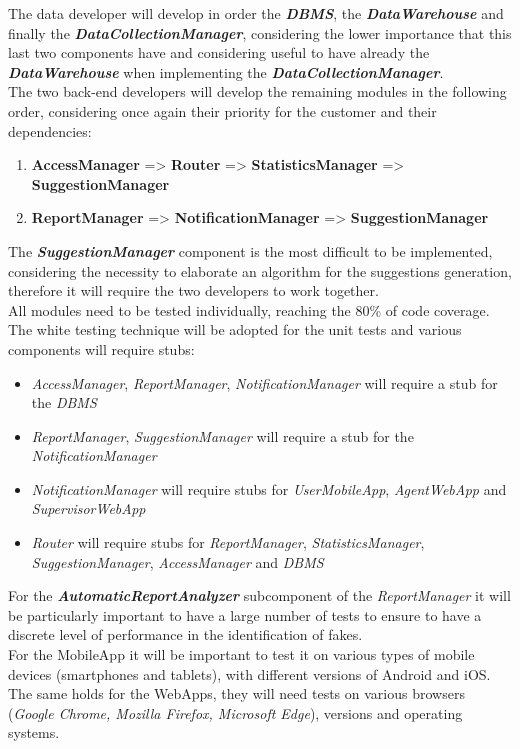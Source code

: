 \documentclass[a4paper]{report}
\begin{document}
The data developer will develop in order the \textbf{\textit{DBMS}}, the \textbf{\textit{DataWarehouse}} and finally the \textbf{\textit{DataCollectionManager}}, considering the lower importance that this last two components have and considering useful to have already the \textbf{\textit{DataWarehouse}} when implementing the \textit{\textbf{DataCollectionManager}}.\\
The two back-end developers will develop the remaining modules in the following order, considering once again their priority for the customer and their dependencies:
\begin{enumerate}[label=\arabic*)]
\item \textbf{AccessManager} => \textbf{Router} => \textbf{StatisticsManager} => \textbf{SuggestionManager}
\item \textbf{ReportManager} => \textbf{NotificationManager}  => \textbf{SuggestionManager}
\end{enumerate}
The \textbf{\textit{SuggestionManager}} component is the most difficult to be implemented, considering the necessity to elaborate an algorithm for the suggestions generation, therefore it will require the two developers to work together.\\
All modules need to be tested individually, reaching the 80\% of code coverage. The white testing technique will be adopted for the unit tests and various components will require stubs:
\begin{itemize}
\item \textit{AccessManager}, \textit{ReportManager}, \textit{NotificationManager} will require a stub for the \textit{DBMS}
\item \textit{ReportManager}, \textit{SuggestionManager} will require a stub for the \textit{NotificationManager}
\item \textit{NotificationManager} will require stubs for \textit{UserMobileApp}, \textit{AgentWebApp} and \textit{SupervisorWebApp}
\item \textit{Router} will require stubs for \textit{ReportManager}, \textit{StatisticsManager}, \textit{SuggestionManager}, \textit{AccessManager} and \textit{DBMS}
\end{itemize}
For the \textbf{\textit{AutomaticReportAnalyzer}} subcomponent of the \textit{ReportManager} it will be particularly important to have a large number of tests to ensure to have a discrete level of performance in the identification of fakes.\\
For the MobileApp it will be important to test it on various types of mobile devices (smartphones and tablets), with different versions of Android and iOS. The same holds for the WebApps, they will need tests on various browsers (\textit{Google Chrome, Mozilla Firefox, Microsoft Edge}), versions and operating systems.
\end{document}
